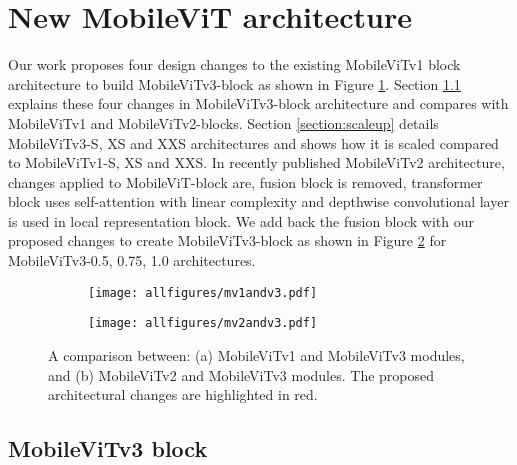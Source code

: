 \documentclass{article} \usepackage{iclr2022_conference,times}
\begin{document}
\section{New MobileViT architecture}
\label{headings}

Our work proposes four design changes to the existing MobileViTv1 block architecture to build MobileViTv3-block as shown in Figure \ref{fig:mv1v3}. 
Section \ref{section:mv3blocks} explains these four changes in MobileViTv3-block architecture and compares with MobileViTv1 and MobileViTv2-blocks. 
Section \ref{section:scaleup} details MobileViTv3-S, XS and XXS architectures and shows how it is scaled compared to MobileViTv1-S, XS and XXS.
In recently published MobileViTv2 architecture, changes applied to MobileViT-block are, fusion block is removed, transformer block uses self-attention with linear complexity and depthwise convolutional layer is used in local representation block. We add back the fusion block with our proposed changes to create MobileViTv3-block as shown in Figure \ref{fig:mv2v3} for MobileViTv3-0.5, 0.75, 1.0 architectures.


\begin{figure}
\centering
\begin{subfigure}{.5\textwidth}
  \centering
  \texttt{[image: allfigures/mv1andv3.pdf]}
  \label{fig:mv1v3}
\end{subfigure}\begin{subfigure}{.5\textwidth}
  \centering
  \texttt{[image: allfigures/mv2andv3.pdf]}
  \label{fig:mv2v3}
\end{subfigure}
\caption{A comparison between: (a) MobileViTv1 and MobileViTv3 modules, and (b) MobileViTv2 and MobileViTv3 modules. The proposed architectural changes are highlighted in red.}
\label{fig:blocks}
\end{figure}

\subsection{MobileViTv3 block} \label{section:mv3blocks}
\end{document}
